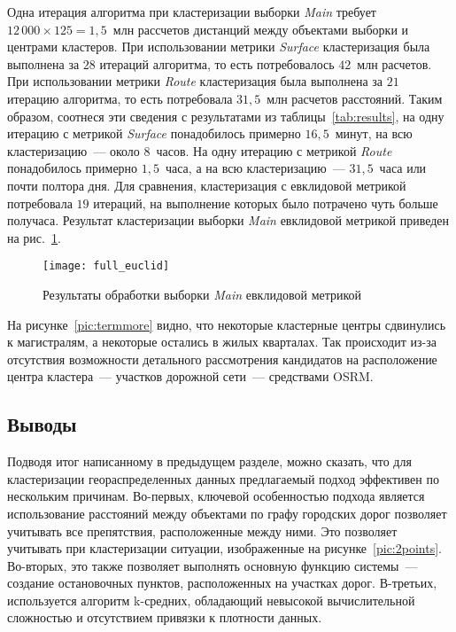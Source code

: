Одна итерация алгоритма при кластеризации выборки \emph{Main} требует \( 12\,000 \times 125 = 1,\!5 \)~млн рассчетов дистанций между объектами выборки и центрами кластеров. При использовании метрики \emph{Surface} кластеризация была выполнена за \( 28 \) итераций алгоритма, то есть потребовалось \( 42 \)~млн расчетов. При использовании метрики \emph{Route} кластеризация была выполнена за \( 21 \) итерацию алгоритма, то есть потребовала \( 31,\!5 \)~млн расчетов расстояний. Таким образом, соотнеся эти сведения с результатами из таблицы~\ref{tab:results}, на одну итерацию с метрикой \emph{Surface} понадобилось примерно \( 16,\!5 \)~минут, на всю кластеризацию~--- около \( 8 \)~часов. На одну итерацию с метрикой \emph{Route} понадобилось примерно \( 1,\!5 \)~часа, а на всю кластеризацию~--- \( 31,\!5 \)~часа или почти полтора дня. Для сравнения, кластеризация с евклидовой метрикой потребовала \( 19 \) итераций, на выполнение которых было потрачено чуть больше получаса. Результат кластеризации выборки \emph{Main} евклидовой метрикой приведен на рис.~\ref{pic:full-euclid}.
\begin{figure}[h!]
    \centering
    \texttt{[image: full\_euclid]} \\[1ex]
    \parbox{.9\textwidth}{\caption{Результаты обработки выборки \emph{Main} евклидовой метрикой}\label{pic:full-euclid}}
    \vspace*{-1em}
\end{figure}

На рисунке~\ref{pic:termmore} видно, что некоторые кластерные центры сдвинулись к магистралям, а некоторые остались в жилых кварталах. Так происходит из-за отсутствия возможности детального рассмотрения кандидатов на расположение центра кластера~--- участков дорожной сети~--- средствами OSRM.

\subsection{Выводы} \label{sec:conclusions}
Подводя итог написанному в предыдущем разделе, можно сказать, что для кластеризации геораспределенных данных предлагаемый подход эффективен по нескольким причинам. Во-первых, ключевой особенностью подхода является использование расстояний между объектами по графу городских дорог позволяет учитывать все препятствия, расположенные между ними. Это позволяет учитывать при кластеризации ситуации, изображенные на рисунке~\ref{pic:2points}. Во-вторых, это также позволяет выполнять основную функцию системы~--- создание остановочных пунктов, расположенных на участках дорог. В-третьих, используется алгоритм k-средних, обладающий невысокой вычислительной сложностью и отсутствием привязки к плотности данных.

